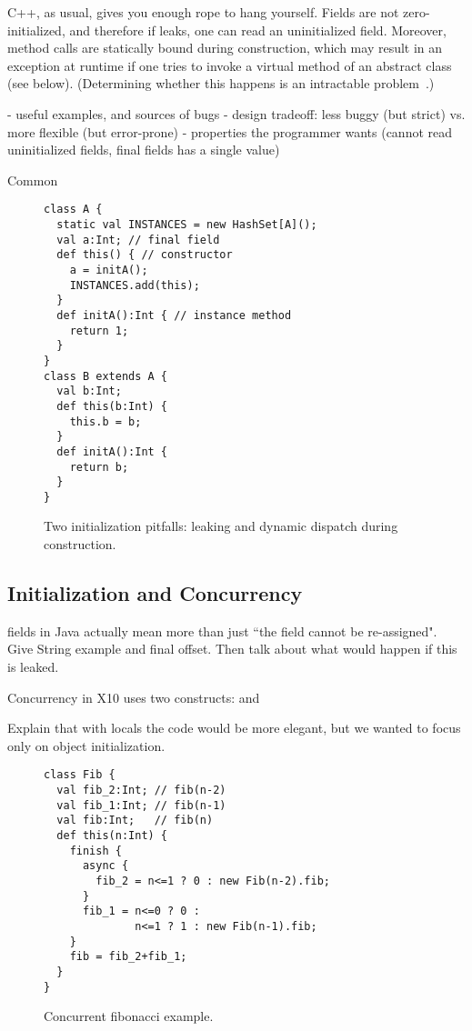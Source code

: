 \mbox{C++}, as usual, gives you enough rope to hang yourself.
Fields are not zero-initialized, and therefore if \this leaks,
    one can read an uninitialized field.
Moreover, method calls are statically bound during construction,
    which may result in an exception at runtime
    if one tries to invoke a virtual method of an abstract class (see  below).
(Determining whether this happens is an intractable problem~\cite{Gil:1998:CTA:646155.679689}.)

- useful examples, and sources of bugs
- design tradeoff: less buggy (but strict) vs. more flexible (but error-prone)
- properties the programmer wants (cannot read uninitialized fields, final fields has a single value)

Common
\begin{figure}
\begin{lstlisting}
class A {
  static val INSTANCES = new HashSet[A]();
  val a:Int; // final field
  def this() { // constructor
    a = initA();
    INSTANCES.add(this);
  }
  def initA():Int { // instance method
    return 1;
  }
}
class B extends A {
  val b:Int;
  def this(b:Int) {
    this.b = b;
  }
  def initA():Int {
    return b;
  }
}
\end{lstlisting}
\caption{Two initialization pitfalls:
    leaking \this and dynamic dispatch during construction.}
\label{Figure:TwoPitfalls}
\end{figure}

\subsection{Initialization and Concurrency}
 fields in Java actually mean more than just ``the field cannot be re-assigned".
Give String example and final offset.
Then talk about what would happen if this is leaked.

Concurrency in X10 uses two constructs:
 and 

Explain that with locals the code would be more elegant,
    but we wanted to focus only on object initialization.
\begin{figure}
\begin{lstlisting}
class Fib {
  val fib_2:Int; // fib(n-2)
  val fib_1:Int; // fib(n-1)
  val fib:Int;   // fib(n)
  def this(n:Int) {
    finish {
      async {
        fib_2 = n<=1 ? 0 : new Fib(n-2).fib;
      }
      fib_1 = n<=0 ? 0 :
              n<=1 ? 1 : new Fib(n-1).fib;
    }
    fib = fib_2+fib_1;
  }
}
\end{lstlisting}
\caption{Concurrent fibonacci example.}
\label{Figure:ConcurrentFib}
\end{figure}

